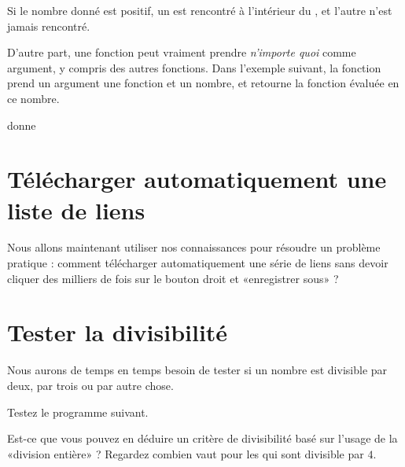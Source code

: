 

Si le nombre donné est positif, un  est rencontré à l'intérieur du , et l'autre  n'est jamais rencontré.

D'autre part, une fonction peut vraiment prendre \emph{n'importe quoi} comme argument, y compris des autres fonctions. Dans l'exemple suivant, la fonction  prend un argument une fonction et un nombre, et retourne la fonction évaluée en ce nombre.



donne



\section{Télécharger automatiquement une liste de liens}

Nous allons maintenant utiliser nos connaissances pour résoudre un problème pratique : comment télécharger automatiquement une série de liens sans devoir cliquer des milliers de fois sur le bouton droit et «enregistrer sous» ?

\section{Tester la divisibilité}

Nous aurons de temps en temps besoin de tester si un nombre est divisible par deux, par trois ou par autre chose.

Testez le programme suivant.



Est-ce que vous pouvez en déduire un critère de divisibilité basé sur l'usage de la «division entière» \info{\%} ? Regardez combien vaut  pour les  qui sont divisible par \( 4\).



